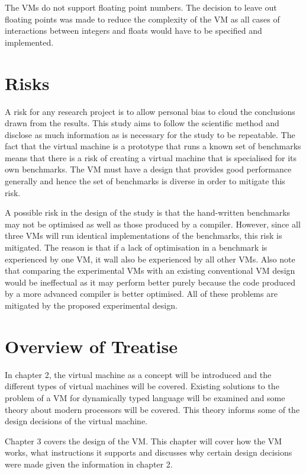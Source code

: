 \documentclass[english,a4paper,12pt]{report}
\begin{document}
The VMs do not support floating point numbers. The decision to leave
out floating points was made to reduce the complexity of the VM as all
cases of interactions between integers and floats would have to be
specified and implemented.


\section{Risks}
A risk for any research project is to allow personal bias to cloud the
conclusions drawn from the results. This study aims to follow the
scientific method and disclose as much information as is necessary for
the study to be repeatable. The fact that the virtual machine is a
prototype that runs a known set of benchmarks means that there is a
risk of creating a virtual machine that is specialised for its own
benchmarks. The VM must have a design that provides good performance
generally and hence the set of benchmarks is diverse in order to
mitigate this risk.

A possible risk in the design of the study is that the hand-written
benchmarks may not be optimised as well as those produced by a
compiler. However, since all three VMs will run identical
implementations of the benchmarks, this risk is mitigated. The reason
is that if a lack of optimisation in a benchmark is experienced by one
VM, it wall also be experienced by all other VMs. Also note that
comparing the experimental VMs with an existing conventional VM design
would be ineffectual as it may perform better purely because the code
produced by a more advanced compiler is better optimised. All of these
problems are mitigated by the proposed experimental design.

\section{Overview of Treatise}
In chapter 2, the virtual machine as a concept will be introduced and
the different types of virtual machines will be covered. Existing
solutions to the problem of a VM for dynamically typed language will
be examined and some theory about modern processors will be
covered. This theory informs some of the design decisions of the
virtual machine.

Chapter 3 covers the design of the VM. This chapter will cover how the
VM works, what instructions it supports and discusses why certain
design decisions were made given the information in chapter 2.
\end{document}
